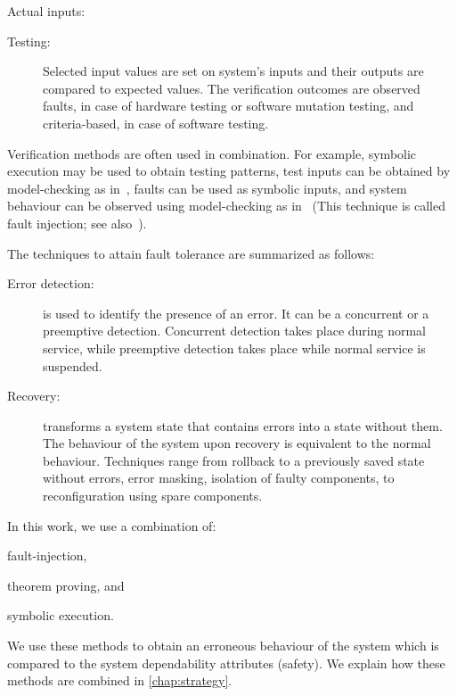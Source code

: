 \documentclass[12pt,openright,twoside,a4paper,oldfontcommands,english,brazil,final]{abntex2}
\theoremstyle{theo}
\begin{document}
\begin{sloppypar}
\begin{alineas}
\begin{subalineas}
\begin{description}
    \end{description}
    \item Actual inputs:
    \begin{description}
      \item[Testing:] Selected input values are set on system's inputs and their outputs are compared to expected values.
      The verification outcomes are observed faults, in case of hardware testing or software mutation testing, and criteria-based, in case of software testing.
    \end{description}
  \end{subalineas}
\end{alineas}
\end{sloppypar}


Verification methods are often used in combination.
For example, symbolic execution may be used to obtain testing patterns, test inputs can be obtained by model-checking as in~\cite{CBC+2015}, faults can be used as symbolic inputs, and system behaviour can be observed using model-checking as in~\cite{DM2012,Didier2012} (This technique is called fault injection; see also~\cite{AAL+1996}).

The techniques to attain fault tolerance are summarized as follows:
\begin{description}
  \item[Error detection:] is used to identify the presence of an error.
  It can be a concurrent or a preemptive detection.
  Concurrent detection takes place during normal service, while preemptive detection takes place while normal service is suspended.
  \item[Recovery:] transforms a system state that contains errors into a state without them. The behaviour of the system upon recovery is equivalent to the normal behaviour.
  Techniques range from rollback to a previously saved state without errors, error masking, isolation of faulty components, to reconfiguration using spare components.
\end{description}

In this work, we use a combination of:
\begin{alineasinline}
  \item fault-injection,
  \item theorem proving, and
  \item symbolic execution.
\end{alineasinline}
We use these methods to obtain an erroneous behaviour of the system which is compared to the system dependability attributes (safety).
We explain how these methods are combined in \cref{chap:strategy}.
\end{document}
